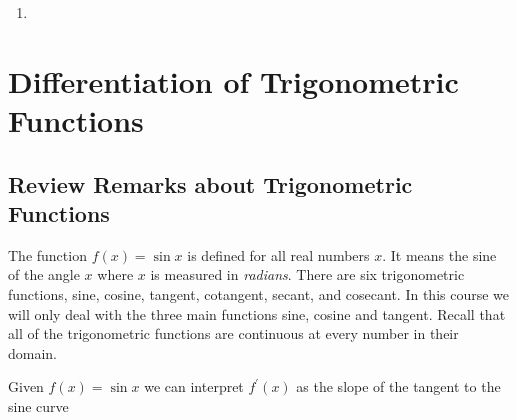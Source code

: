 \begin{enumerate}
\item   
\columnsep =30pt
 \end{enumerate}


\section{Differentiation of Trigonometric Functions}


\subsection{Review Remarks about Trigonometric Functions}
The function $f (x) =\sin  x$ is defined for all real numbers $x$. It means the sine of the angle $x$ where $x$ is measured in \emph{radians}. There are six trigonometric functions,
sine, cosine, tangent, cotangent, secant, and cosecant. In this course we will only deal with the three main
functions sine, cosine and tangent. Recall that all of the trigonometric functions are continuous at every number
in their domain. 

Given $f (x) =\sin  x$ we can interpret $f^{ \prime } (x)$ as the slope of the tangent to the sine curve 

